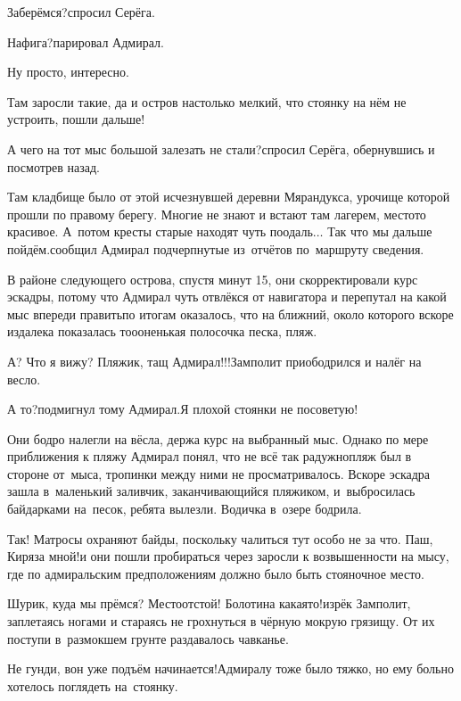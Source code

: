 \diagdash Заберёмся?\mdash спросил Серёга.

\diagdash Нафига?\mdash парировал Адмирал.

\diagdash Ну просто, интересно.

\diagdash Там заросли такие, да и остров настолько мелкий, что стоянку на нём не устроить, пошли дальше!

\diagdash А чего на тот мыс большой залезать не стали?\mdash спросил Серёга, обернувшись и посмотрев назад.

\diagdash Там кладбище было от этой исчезнувшей деревни Мярандукса, урочище которой прошли по правому берегу. Многие не знают и встают там лагерем, место\sdash то красивое. А~потом кресты старые находят чуть поодаль$\ldots$ Так что мы дальше пойдём.\mdash сообщил Адмирал подчерпнутые из~отчётов по~маршруту сведения.

В районе следующего острова, спустя минут 15, они скорректировали курс эскадры, потому что Адмирал чуть отвлёкся от навигатора и перепутал на какой мыс впереди править\mdash по итогам оказалось, что на ближний, около которого вскоре издалека показалась то\sdash о\sdash оненькая полосочка песка, пляж.

\diagdash А? Что я вижу? Пляжик, тащ Адмирал!!!\mdash Замполит приободрился и налёг на весло.

\diagdash А то?\mdash подмигнул тому Адмирал.\mdash Я плохой стоянки не посоветую!

Они бодро налегли на вёсла, держа курс на выбранный мыс. Однако по мере приближения к пляжу Адмирал понял, что не всё так радужно\mdash пляж был в стороне от~мыса, тропинки между ними не просматривалось. Вскоре эскадра зашла в~маленький заливчик, заканчивающийся пляжиком, и~выбросилась байдарками на~песок, ребята вылезли. Водичка в~озере бодрила.

\diagdash Так! Матросы охраняют байды, поскольку чалиться тут особо не за что. Паш, Киря\mdash за мной!\mdash и они пошли пробираться через заросли к возвышенности на мысу, где по адмиральским предположениям должно было быть стояночное место.

\diagdash Шурик, куда мы прёмся? Место\mdash отстой! Болотина какая\sdash то!\mdash изрёк Замполит, заплетаясь ногами и стараясь не грохнуться в чёрную мокрую грязищу. От их поступи в~размокшем грунте раздавалось чавканье.

\diagdash Не гунди, вон уже подъём начинается!\mdash Адмиралу тоже было тяжко, но ему больно хотелось поглядеть на~стоянку. 

